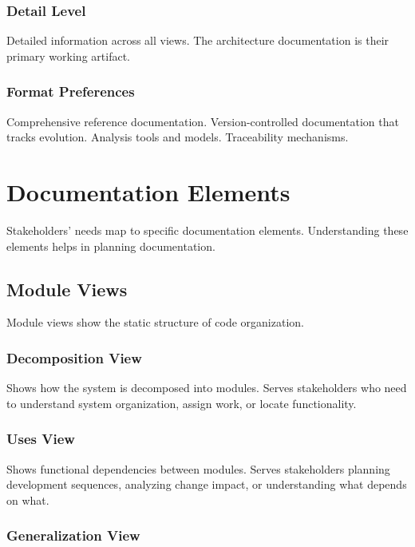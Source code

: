 \documentclass[11pt]{article}
\begin{document}
\subsubsection{Detail Level}

Detailed information across all views. The architecture documentation is their primary working artifact.

\subsubsection{Format Preferences}

Comprehensive reference documentation. Version-controlled documentation that tracks evolution. Analysis tools and models. Traceability mechanisms.

\section{Documentation Elements}

Stakeholders' needs map to specific documentation elements. Understanding these elements helps in planning documentation.

\subsection{Module Views}

Module views show the static structure of code organization.

\subsubsection{Decomposition View}

Shows how the system is decomposed into modules. Serves stakeholders who need to understand system organization, assign work, or locate functionality.

\subsubsection{Uses View}

Shows functional dependencies between modules. Serves stakeholders planning development sequences, analyzing change impact, or understanding what depends on what.

\subsubsection{Generalization View}
\end{document}
